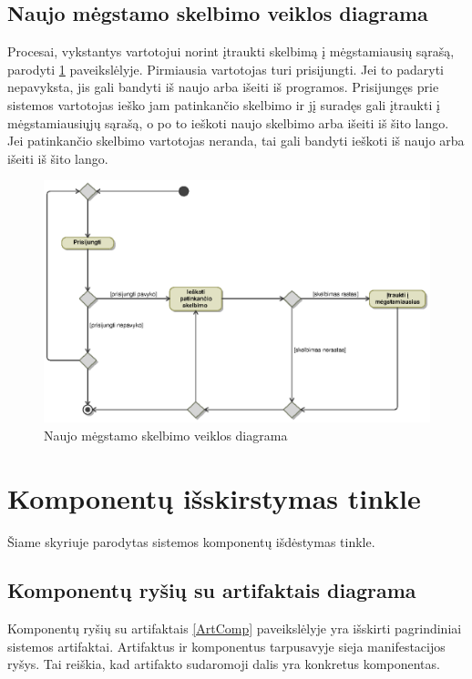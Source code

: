 \documentclass[12pt]{article}
\begin{document}
	\subsection{Naujo mėgstamo skelbimo veiklos diagrama}
	Procesai, vykstantys vartotojui norint įtraukti skelbimą į mėgstamiausių sąrašą, parodyti \ref{FavActivity} paveikslėlyje. Pirmiausia vartotojas turi prisijungti. Jei to padaryti nepavyksta, jis gali bandyti iš naujo arba išeiti iš programos. Prisijungęs prie sistemos vartotojas ieško jam patinkančio skelbimo ir jį suradęs gali įtraukti į mėgstamiausiųjų sąrašą, o po to ieškoti naujo skelbimo arba išeiti iš šito lango. Jei patinkančio skelbimo vartotojas neranda, tai gali bandyti ieškoti iš naujo arba išeiti iš šito lango.
	\begin{figure}[h]
		\begin{center}
			\includegraphics[width=\textwidth]{MegstamiausiuVeikla.eps}
			\caption{Naujo mėgstamo skelbimo veiklos diagrama\label{FavActivity}}
		\end{center}
	\end{figure}
	
	\pagebreak
	
	\section{Komponentų išskirstymas tinkle}
	Šiame skyriuje parodytas sistemos komponentų išdėstymas tinkle.
	\subsection{Komponentų ryšių su artifaktais diagrama}
	
	Komponentų ryšių su artifaktais \ref{ArtComp} paveikslėlyje yra išskirti pagrindiniai sistemos artifaktai. Artifaktus ir komponentus tarpusavyje sieja manifestacijos ryšys. Tai reiškia, kad artifakto sudaromoji dalis yra konkretus komponentas.
	
\end{document}
